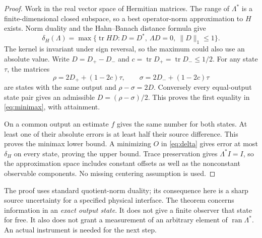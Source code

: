 \documentclass[12pt,a4paper]{article}
\theoremstyle{definition}
\newcommand{\tr}{\operatorname{tr}}
\newcommand{\ran}{\operatorname{ran}}
\begin{document}
\begin{proof}
Work in the real vector space of Hermitian matrices. The range of
$\Lambda^*$ is a finite-dimensional closed subspace, so a best
operator-norm approximation to $H$ exists. Norm duality and the
Hahn--Banach distance formula give
\begin{equation}
 \delta_H(\Lambda)
 =\max\{\tr HD:D=D^*,\ \Lambda D=0,\ \|D\|_1\leq1\}.
 \label{eq:dual}
\end{equation}
The kernel is invariant under sign reversal, so the maximum could also
use an absolute value. Write $D=D_+-D_-$ and
$c=\tr D_+=\tr D_-\leq1/2$. For any state $\tau$, the matrices
\begin{equation}
 \rho=2D_++(1-2c)\tau,\qquad
 \sigma=2D_-+(1-2c)\tau
\end{equation}
are states with the same output and $\rho-\sigma=2D$. Conversely every
equal-output state pair gives an admissible $D=(\rho-\sigma)/2$.
This proves the first equality in \eqref{eq:minimax}, with attainment.

On a common output an estimate $f$ gives the same number for both states.
At least one of their absolute errors is at least half their source
difference. This proves the minimax lower bound. A minimizing $O$ in
\eqref{eq:delta} gives error at most $\delta_H$ on every state, proving
the upper bound. Trace preservation gives $\Lambda^*I=I$, so the
approximation space includes constant offsets as well as the nonconstant
observable components. No missing centering assumption is used.
\end{proof}

The proof uses standard quotient-norm duality; its consequence here is a
sharp source uncertainty for a specified physical interface. The theorem
concerns information in an \emph{exact output state}. It
does not give a finite observer that state for free. It also does not
grant a measurement of an arbitrary element of $\ran\Lambda^*$.
An actual instrument is needed for the next step.
\end{document}
